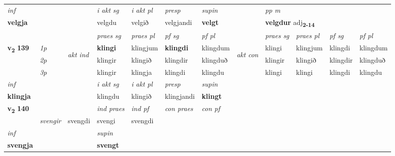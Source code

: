 \begin{longtable}[l]{X>{\footnotesize\itshape}llXXXXlXXXX}
\cmidrule{4-7}
   {\textit{inf}} & &  & \textit{i akt sg} & \textit{i akt pl}   & \textit{presp} & \textit{supin}  && \textit{pp m} \\*
  {\textbf{velgja}} & && velgdu  & velgið   & velgjandi &  \textbf{velgt}  && \multicolumn{2}{l}{\textbf{velgdur} adj\textbf{\textsubscript{2-14}}} \\*

\midrule

 & &   & \textit{praes sg}  & \textit{praes pl}    & \textit{ pf sg} & \textit{pf pl} & & \textit{praes sg}  & \textit{praes pl}    & \textit{pf sg} & \textit{pf pl }  \\ \cmidrule{4-7} \cmidrule{9-12}
 \multirow{2}{*}{{{\textbf{v{\textsubscript{2}}} \Large{\textbf{139}}}}}  & 1p & \multirow{3}{*}{\begin{turn}{90}\textit{akt ind}\end{turn}} & \textbf{klingi} & klingjum & \textbf{klingdi} & klingdum & \multirow{3}{*}{\begin{turn}{90}\textit{akt con}\end{turn}} &klingi & klingjum & klingdi & klingdum\\*
 & 2p &  &  klingir  & klingið & klingdir & klingduð & & klingir & klingið & klingdir & klingduð \\*
 & 3p &  & klingir & klingja & klingdi & klingdu & & klingi & klingi& klingdi & klingdu \\*
\cmidrule{4-7} \cmidrule{9-12}

   {\textit{inf}} & &  & \textit{i akt sg} & \textit{i akt pl}   & \textit{presp} & \textit{supin}   \\*
  {\textbf{klingja}} & && klingdu  & klingið   & klingjandi &  \textbf{klingt}   \\*

\midrule

\multirow{2}{*}{{{\textbf{v{\textsubscript{2}}} \Large{\textbf{140}}}}}  &&&  \textit{ind praes} & \textit{ind pf} & \textit{con praes} & \textit{con pf} \\*
\multicolumn{3}{r}{\textit{e-n}} & svengir & svengdi & svengi & svengdi \\*

\cmidrule{4-7}
   {\textit{inf}} & &      & \textit{supin}   \\*
  {\textbf{svengja}} & &      &  \textbf{svengt}   \\*

\midrule


\end{longtable}
